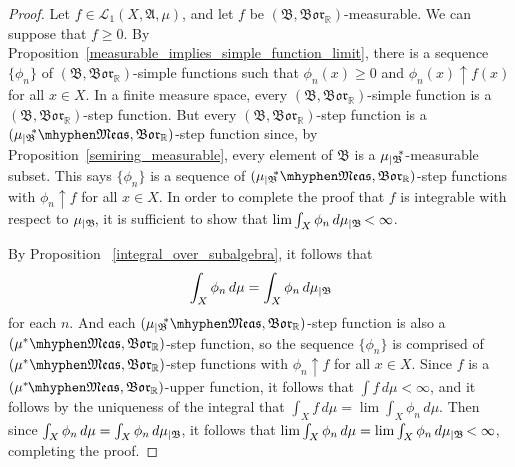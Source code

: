 \documentclass[
twoside=true,
paper=letter,
fontsize=11pt,
pagesize=auto,
leqno,
openany,
headsepline,
overfullrule,
]{scrbook}
\theoremstyle{plain}
\theoremstyle{plain}
\theoremstyle{definition}
\theoremstyle{bfnoteitalic}
\theoremstyle{bfnoteroman}
\newcommand{\sigalg}[1]{\mathfrak{#1}}
\newcommand{\cali}[1]{\mathscr{#1}}
\newcommand{\borel}{\mathfrak{Bor}}
\newcommand{\restrictedto}[1]{_{\lvert#1}\kern-1.5pt}
\newcommand{\R}{\mathbb{R}}
\newcommand{\sigmaalgebra}{\sigalg{A}}
\newcommand{\sigmaalgebraii}{\sigalg{B}}
\newcommand{\measurable}[1]{{#1}\mhyphen\mathfrak{Meas}}
\newcommand{\kernast}{\ast\kern-1pt}
\newcommand{\measuresubstar}[1]{\measure\restrictedto{#1}\kern-2pt^*}
\newcommand{\measurespace}{X}
\newcommand{\measure}{\mu}
\begin{document}
\begin{proof}
Let $f\in\cali{L}_1(\measurespace, \sigmaalgebra, \measure)$, and let $f$ be 
$(\sigmaalgebraii, \borel_\R)$\hyp{}measurable. We can suppose that $f\geq 0$.  By Proposition~\ref{measurable_implies_simple_function_limit}, there is a sequence $\{\phi_n\}$ of $(\sigmaalgebraii, \borel_\R)$-simple functions such that 
$\phi_n(x)\geq 0$ and $\phi_n(x)\uparrow f(x)$ for all $x\in\measurespace$.
In a finite measure space, every $(\sigmaalgebraii, \borel_\R)$-simple function is a $(\sigmaalgebraii, \borel_\R)$-step function.
But every $(\sigmaalgebraii, \borel_\R)$-step function is a 
$(\measurable{\measuresubstar{\sigmaalgebraii}},\borel_\R)$-step function since, 
by Proposition~\ref{semiring_measurable}, every element of $\sigmaalgebraii$ is a $\measuresubstar{\sigmaalgebraii}$-measurable subset. 
This says $\{\phi_n\}$ is a sequence of $(\measurable{\measuresubstar{\sigmaalgebraii}},\borel_\R)$-step functions with $\phi_n\uparrow f$ for all $x\in\measurespace$. In order to complete the proof that $f$ is integrable with respect to $\measure\restrictedto{\sigmaalgebraii}$, it is sufficient to show that 
$\lim \int_\measurespace \phi_n \, d \measure\restrictedto{\sigmaalgebraii} < \infty$.

By Proposition ~\ref{integral_over_subalgebra}, it follows that
\[
\int_\measurespace \phi_n \, d\measure
= \int_\measurespace \phi_n \, d\measure\restrictedto{\sigmaalgebraii}
\]
for each $n$.
And each $(\measurable{\measuresubstar{\sigmaalgebraii}},\borel_\R)$-step function is also a $(\measurable{\measure^*},\borel_\R)$-step function, so the sequence
$\{\phi_n\}$ is comprised of $(\measurable{\measure^*},\borel_\R)$-step functions with $\phi_n\uparrow f$ for all $x\in\measurespace$.
Since $f$ is a $(\measurable{\measure^\kernast}, \borel_\R)$-upper function, 
it follows that $\int f\,d\measure<\infty$, and it follows by the uniqueness of the integral that 
$\int_\measurespace f \, d\measure
=
\lim\int_\measurespace \phi_n \, d\measure$.
Then since 
$\int_\measurespace \phi_n \, d\measure
= 
\int_\measurespace \phi_n \, d\measure\restrictedto{\sigmaalgebraii}$,
it follows that 
$\lim\int_\measurespace \phi_n \, d\measure
= 
\lim\int_\measurespace \phi_n \, d\measure\restrictedto{\sigmaalgebraii}<\infty$, completing the proof.
\end{proof}
\end{document}
